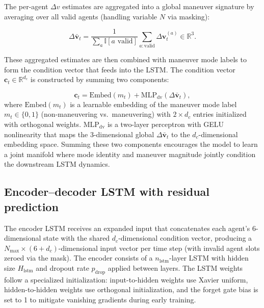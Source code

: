 \documentclass[a4paper,fleqn]{cas-dc}
\begin{document}
The per-agent $\Delta v$ estimates are aggregated into a global maneuver signature by averaging over all valid agents (handling variable $N$ via masking):

\begin{equation}
    \Delta \bar{\bm{v}}_t = \frac{1}{\sum_{a} \mathbb{I}[a \text{ valid}]} \sum_{a: \text{valid}} \Delta \bm{v}^{(a)}_t \in \mathbb{R}^{3}.
\end{equation}

These aggregated estimates are then combined with maneuver mode labels to form the condition vector that feeds into the LSTM. The condition vector $\bm{c}_t \in \mathbb{R}^{d_{\mathrm{c}}}$ is constructed by summing two components:

\begin{equation}
    \bm{c}_t = \text{Embed}(m_t) + \text{MLP}_{\text{dv}}(\Delta \bar{\bm{v}}_t),
\end{equation}
where $\text{Embed}(m_t)$ is a learnable embedding of the maneuver mode label $m_t \in \{0, 1\}$ (non-maneuvering vs.\ maneuvering) with $2 \times d_c$ entries initialized with orthogonal weights. $\text{MLP}_{\text{dv}}$ is a two-layer perceptron with GELU nonlinearity that maps the 3-dimensional global $\Delta \bar{\bm{v}}_t$ to the $d_c$-dimensional embedding space. Summing these two components encourages the model to learn a joint manifold where mode identity and maneuver magnitude jointly condition the downstream LSTM dynamics.

\subsection{Encoder--decoder LSTM with residual prediction}

The encoder LSTM receives an expanded input that concatenates each agent's 6-dimensional state with the shared $d_c$-dimensional condition vector, producing a $N_{\max} \times (6 + d_c)$-dimensional input vector per time step (with invalid agent slots zeroed via the mask). The encoder consists of a $n_{\text{lstm}}$-layer LSTM with hidden size $H_{\text{lstm}}$ and dropout rate $p_{\text{drop}}$ applied between layers. The LSTM weights follow a specialized initialization: input-to-hidden weights use Xavier uniform, hidden-to-hidden weights use orthogonal initialization, and the forget gate bias is set to 1 to mitigate vanishing gradients during early training.
\end{document}

